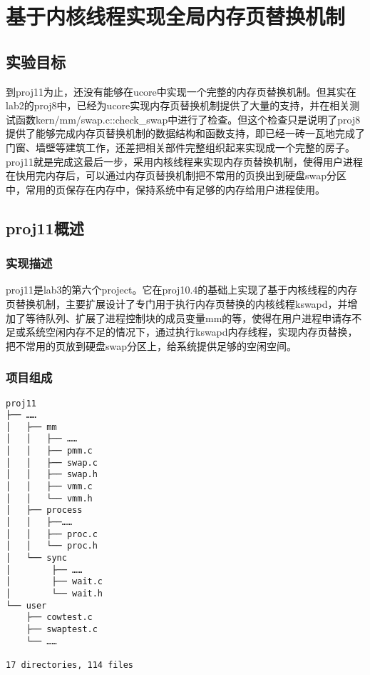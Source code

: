 \section{基于内核线程实现全局内存页替换机制}\label{ux57faux4e8eux5185ux6838ux7ebfux7a0bux5b9eux73b0ux5168ux5c40ux5185ux5b58ux9875ux66ffux6362ux673aux5236}

\subsection{实验目标}\label{ux5b9eux9a8cux76eeux6807}

到proj11为止，还没有能够在ucore中实现一个完整的内存页替换机制。但其实在lab2的proj8中，已经为ucore实现内存页替换机制提供了大量的支持，并在相关测试函数kern/mm/swap.c::check\_swap中进行了检查。但这个检查只是说明了proj8提供了能够完成内存页替换机制的数据结构和函数支持，即已经一砖一瓦地完成了门窗、墙壁等建筑工作，还差把相关部件完整组织起来实现成一个完整的房子。proj11就是完成这最后一步，采用内核线程来实现内存页替换机制，使得用户进程在快用完内存后，可以通过内存页替换机制把不常用的页换出到硬盘swap分区中，常用的页保存在内存中，保持系统中有足够的内存给用户进程使用。

\subsection{proj11概述}\label{proj11ux6982ux8ff0}

\subsubsection{实现描述}\label{ux5b9eux73b0ux63cfux8ff0}

proj11是lab3的第六个project。它在proj10.4的基础上实现了基于内核线程的内存页替换机制，主要扩展设计了专门用于执行内存页替换的内核线程kswapd，并增加了等待队列、扩展了进程控制块的成员变量mm的等，使得在用户进程申请存不足或系统空闲内存不足的情况下，通过执行kswapd内存线程，实现内存页替换，把不常用的页放到硬盘swap分区上，给系统提供足够的空闲空间。

\subsubsection{项目组成}\label{ux9879ux76eeux7ec4ux6210}

\begin{lstlisting}
proj11
├── ……
│   ├── mm
│   │   ├── ……
│   │   ├── pmm.c
│   │   ├── swap.c
│   │   ├── swap.h
│   │   ├── vmm.c
│   │   └── vmm.h
│   ├── process
│   │   ├──……
│   │   ├── proc.c
│   │   └── proc.h
│   └── sync
│        ├── ……
│        ├── wait.c
│        └── wait.h
└── user
    ├── cowtest.c
    ├── swaptest.c
    └── ……

17 directories, 114 files
\end{lstlisting}

